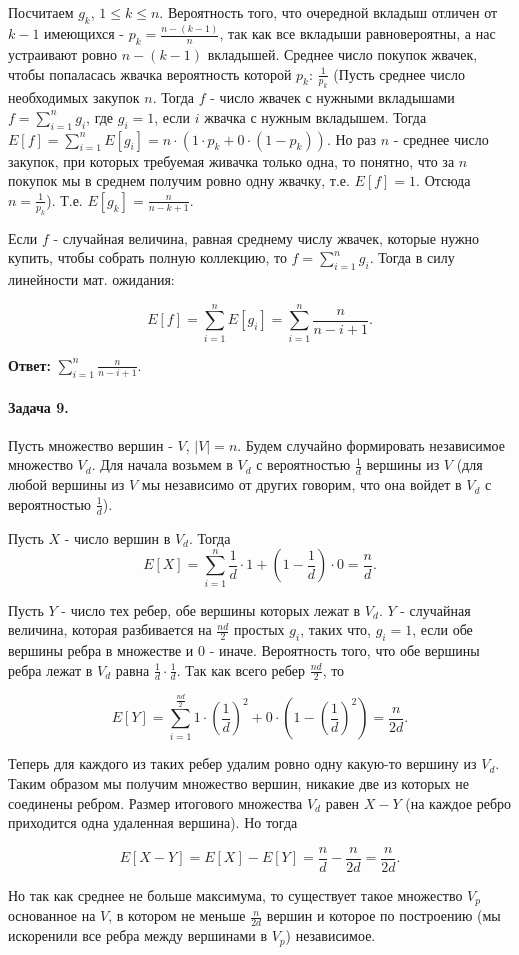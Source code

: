 \documentclass{article}
\begin{document}
    Посчитаем $g_k$, $1 \le k \le n$. Вероятность того, что очередной вкладыш отличен от $k - 1$ имеющихся - $p_k = \frac{n - (k - 1)}{n}$, так как все вкладыши равновероятны, а нас устраивают ровно $n - (k - 1)$ вкладышей. Среднее число покупок жвачек, чтобы попаласась жвачка вероятность которой $p_k$: $\frac{1}{p_k}$ (Пусть среднее число необходимых закупок $n$. Тогда $f$ - число жвачек с нужными вкладышами $f = \sum_{i=1}^{n}g_i$, где $g_i = 1$, если $i$ жвачка с нужным вкладышем. Тогда $E[f] = \sum_{i=1}^{n}E[g_i] = n \cdot (1 \cdot p_k + 0 \cdot (1 - p_k))$. Но раз $n$ - среднее число закупок, при которых требуемая живачка только одна, то понятно, что за $n$ покупок мы в среднем получим ровно одну жвачку, т.е. $E[f] = 1$. Отсюда $n = \frac{1}{p_k}$). Т.е. $E[g_k] = \frac{n}{n - k + 1}$.

    Если $f$ - случайная величина, равная среднему числу жвачек, которые нужно купить, чтобы собрать полную коллекцию, то $f = \sum_{i=1}^{n}g_i$. Тогда в силу линейности мат. ожидания:

    $$ E[f] = \sum_{i=1}^{n} E[g_i] = \sum_{i=1}^{n} \frac{n}{n - i + 1}.$$

    \textbf{Ответ:} $\sum_{i=1}^{n} \frac{n}{n - i + 1}$.

    \paragraph{Задача 9.}
    Пусть множество вершин - $V$, $|V| = n$. Будем случайно формировать независимое множество $V_d$. Для начала возьмем в $V_d$ с вероятностью $\frac{1}{d}$ вершины из $V$ (для любой вершины из $V$ мы независимо от других говорим, что она войдет в $V_d$ с вероятностью $\frac{1}{d}$).

    Пусть $X$ - число вершин в $V_d$. Тогда 
    $$E[X] = \sum_{i=1}^{n} \frac{1}{d} \cdot 1 + (1 - \frac{1}{d}) \cdot 0 = \frac{n}{d}.$$ 
    
    Пусть $Y$ - число тех ребер, обе вершины которых лежат в $V_d$. $Y$ - случайная величина, которая разбивается на $\frac{nd}{2}$ простых $g_i$, таких что, $g_i = 1$, если обе вершины ребра в множестве и $0$ - иначе. Вероятность того, что обе вершины ребра лежат в $V_d$ равна $\frac{1}{d} \cdot \frac{1}{d}$. Так как всего ребер $\frac{nd}{2}$, то 

    $$E[Y] = \sum_{i=1}^{\frac{nd}{2}} 1 \cdot (\frac{1}{d})^ 2 + 0 \cdot (1 - (\frac{1}{d})^2)
           = \frac{n}{2d}.$$
    
    Теперь для каждого из таких ребер удалим ровно одну какую-то вершину из $V_d$. Таким образом мы получим множество вершин, никакие две из которых не соединены ребром. Размер итогового множества $V_d$ равен $X - Y$ (на каждое ребро приходится одна удаленная вершина). Но тогда 

    $$ E[X - Y] = E[X] - E[Y] = \frac{n}{d} - \frac{n}{2d} = \frac{n}{2d}.$$

    Но так как среднее не больше максимума, то существует такое множество $V_p$ основанное на $V$, в котором не меньше $\frac{n}{2d}$ вершин и которое по построению (мы искоренили все ребра между вершинами в $V_p$) независимое.
 
\end{document}
